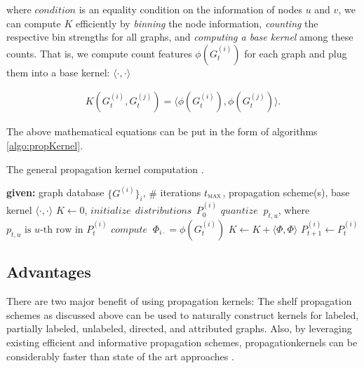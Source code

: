 where $condition$ is an equality condition on the information of nodes
$u$ and $v$, we can compute $K$ efficiently by \emph{binning} the node
information, \emph{counting} the respective bin strengths for all
graphs, and \emph{computing a base kernel} among these counts.  That
is, we compute count features $\phi(G^{(i)}_t)$ for each graph and
plug them into a base kernel: $\langle \cdot,\cdot \rangle$

\begin{align}
 K(G^{(i)}_t, G^{(j)}_t) = \langle\phi(G^{(i)}_t),\phi(G^{(j)}_t)\rangle.
 \label{equ:feature_kernel}
\end{align}
 
 The above mathematical equations can be put in the form of algorithms \ref{algo:propKernel}.
 
 \begin{algorithm}[t]
  \caption{The general propagation kernel computation \citep{Neumann2015}.}
  \begin{algorithmic}
    \State \textbf{given:} graph database $\{G^{(i)}\}_i$, $\#$ iterations $t_{\textsc{max}}$, propagation scheme(s), base kernel $\langle \cdot, \cdot \rangle$
    \State $K \gets 0$, $initialize\;\, distributions\;\, P_0^{(i)}$
    \State $quantize\;\;p_{t,u}$, where $p_{t,u} \text{ is } u\text{-th row in }P^{(i)}_t$ 			
    \EndFor
    \State $compute\;\;  \Phi_{i \cdot} = \phi(G^{(i)}_t)$  
    \EndFor
    \State $K \gets K + \langle \Phi, \Phi\rangle $ 	
    \State $P^{(i)}_{t+1} \gets P^{(i)}_{t}$ 				
    \EndFor
    \EndFor
  \end{algorithmic}
  \label{algo:propKernel}
\end{algorithm}

\subsection{Advantages}
There are two major benefit of using propagation kernels: The shelf propagation schemes as discussed above can be used to naturally construct kernels for labeled, partially labeled, unlabeled, directed, and attributed graphs. Also, by leveraging existing efficient and informative propagation schemes, propagationkernels can be considerably faster than state of the art approaches \citep{Neumann2015}.

